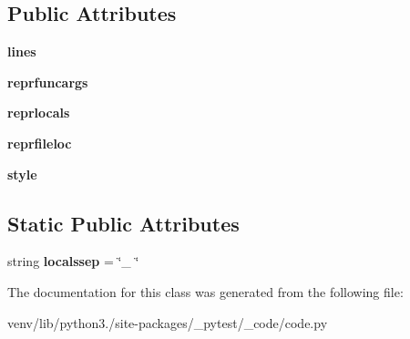 \subsection*{Public Attributes}
\begin{DoxyCompactItemize}
\item 
\mbox{\label{class__pytest_1_1__code_1_1code_1_1_repr_entry_a300f35732e342caf4c974d942f436264}} 
{\bfseries lines}
\item 
\mbox{\label{class__pytest_1_1__code_1_1code_1_1_repr_entry_a6803d8632dad6c10471ad3243d66eb8e}} 
{\bfseries reprfuncargs}
\item 
\mbox{\label{class__pytest_1_1__code_1_1code_1_1_repr_entry_a6c0aa0d3ddf32fa00f6523a8343f6ac9}} 
{\bfseries reprlocals}
\item 
\mbox{\label{class__pytest_1_1__code_1_1code_1_1_repr_entry_a0346f6ba9e7fedabeb78bc8e453ae308}} 
{\bfseries reprfileloc}
\item 
\mbox{\label{class__pytest_1_1__code_1_1code_1_1_repr_entry_a3d712e0f9a0875c5cdfbd987103f4b26}} 
{\bfseries style}
\end{DoxyCompactItemize}
\subsection*{Static Public Attributes}
\begin{DoxyCompactItemize}
\item 
\mbox{\label{class__pytest_1_1__code_1_1code_1_1_repr_entry_a7fd6930d4cdbc3124a56e074655da889}} 
string {\bfseries localssep} = \char`\"{}\+\_\+ \char`\"{}
\end{DoxyCompactItemize}


The documentation for this class was generated from the following file\+:\begin{DoxyCompactItemize}
\item 
venv/lib/python3./site-\/packages/\+\_\+pytest/\+\_\+code/code.\+py\end{DoxyCompactItemize}
